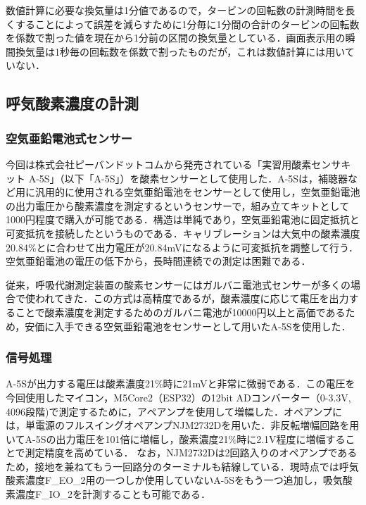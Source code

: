 数値計算に必要な換気量は1分値であるので，タービンの回転数の計測時間を長くすることによって誤差を減らすために1分毎に1分間の合計のタービンの回転数を係数で割った値を現在から1分前の区間の換気量としている．画面表示用の瞬間換気量は1秒毎の回転数を係数で割ったものだが，これは数値計算には用いていない．

\subsection{呼気酸素濃度の計測}

\subsubsection{空気亜鉛電池式センサー}

今回は株式会社ピーバンドットコムから発売されている「実習用酸素センサキット A-5S」（以下「A-5S」）を酸素センサーとして使用した．A-5Sは，補聴器など用に汎用的に使用される空気亜鉛電池をセンサーとして使用し，空気亜鉛電池の出力電圧から酸素濃度を測定するというセンサーで，組み立てキットとして1000円程度で購入が可能である．構造は単純であり，空気亜鉛電池に固定抵抗と可変抵抗を接続したというものである．キャリブレーションは大気中の酸素濃度20.84\%とに合わせて出力電圧が20.84mVになるように可変抵抗を調整して行う．空気亜鉛電池の電圧の低下から，長時間連続での測定は困難である．

従来，呼吸代謝測定装置の酸素センサーにはガルバニ電池式センサーが多くの場合で使われてきた．この方式は高精度であるが，酸素濃度に応じて電圧を出力することで酸素濃度を測定するためのガルバニ電池が10000円以上と高価であるため，安価に入手できる空気亜鉛電池をセンサーとして用いたA-5Sを使用した．

\subsubsection{信号処理}

A-5Sが出力する電圧は酸素濃度21\%時に21mVと非常に微弱である．この電圧を今回使用したマイコン，M5Core2（ESP32）の12bit ADコンバーター（0-3.3V, 4096段階)で測定するために，アペアンプを使用して増幅した．オペアンプには，単電源のフルスイングオペアンプNJM2732Dを用いた．非反転増幅回路を用いてA-5Sの出力電圧を101倍に増幅し，酸素濃度21\%時に2.1V程度に増幅することで測定精度を高めている．
なお，NJM2732Dは2回路入りのオペアンプであるため，接地を兼ねてもう一回路分のターミナルも結線している．現時点では呼気酸素濃度F_EO_2用の一つしか使用していないA-5Sをもう一つ追加し，吸気酸素濃度F_IO_2を計測することも可能である．

